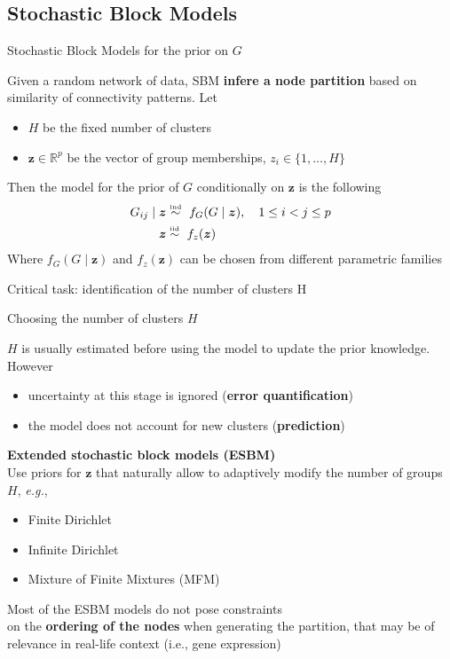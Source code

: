 \subsection{Stochastic Block Models}
\begin{frame}{Stochastic Block Models for the prior on $G$}

Given a random network of data, SBM \textbf{infere a node partition} based on similarity of connectivity patterns. Let
\begin{itemize}
    \item $H$ be the fixed number of clusters
    \item $\bm{z} \in \mathbb{R}^p$ be the vector of group memberships, $z_{i} \in \{1,\ldots,H\}$
\end{itemize} 

Then the model for the prior of $G$ conditionally on $\bm{z}$ is the following
\begin{align*}
    G_{ij} \mid \bm{z} &\ind\  f_{G}(G \mid \bm{z}) , \quad 1 \le i < j \le p \\ %
    \bm{z} &\iid\ f_{z}(\bm{z})
\end{align*}
Where $f_{G}(G \mid \bm{z})$ and $f_{z}(\bm{z})$ can be chosen from different parametric families
\pause
\begin{center}
    Critical task: \alert{identification of the number of clusters H}
\end{center}

\end{frame}







\begin{frame}{Choosing the number of clusters $H$}

$H$ is usually estimated before using the model to update the prior knowledge. However
\begin{itemize}
    \item uncertainty at this stage is ignored (\textbf{error quantification})
    \item the model does not account for new clusters (\textbf{prediction})
\end{itemize}
\horiz
\textbf{\alert{Extended stochastic block models (ESBM)}}\\  
Use priors for $\bm{z}$ that naturally allow to adaptively modify the number of groups $H$, \emph{e.g.},
\begin{itemize}
    \item Finite Dirichlet
    \item Infinite Dirichlet
    \item Mixture of Finite Mixtures (MFM)
\end{itemize}
\centering
Most of the ESBM models do not pose constraints\\ on the \textbf{ordering of the nodes} when generating the partition, that may be of relevance in real-life context (i.e., gene expression)
\end{frame}








